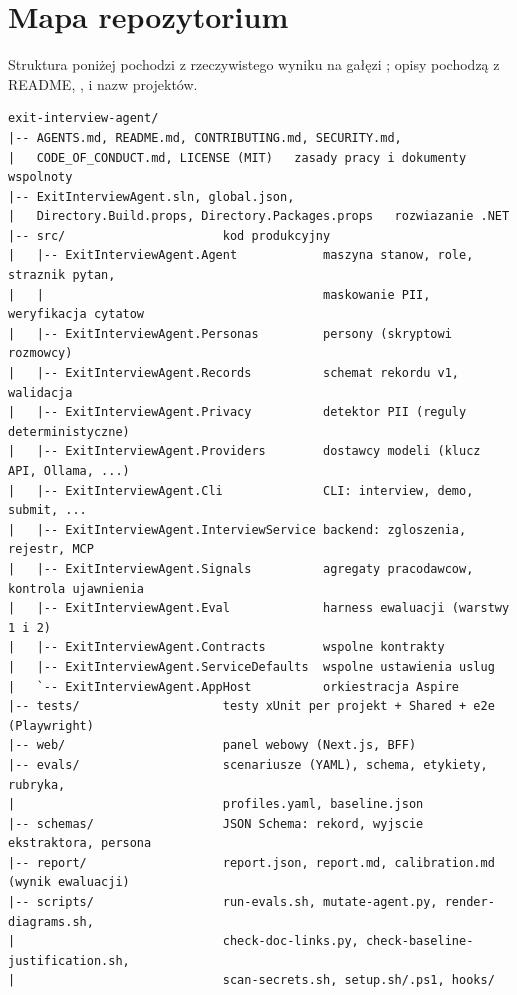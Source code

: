 \section{Mapa repozytorium}
\label{sec:p4-mapa}

Struktura poniżej pochodzi z rzeczywistego wyniku  na gałęzi ; opisy pochodzą z README, ,  i nazw projektów.

\begin{Verbatim}[fontsize=\footnotesize]
exit-interview-agent/
|-- AGENTS.md, README.md, CONTRIBUTING.md, SECURITY.md,
|   CODE_OF_CONDUCT.md, LICENSE (MIT)   zasady pracy i dokumenty wspolnoty
|-- ExitInterviewAgent.sln, global.json,
|   Directory.Build.props, Directory.Packages.props   rozwiazanie .NET
|-- src/                      kod produkcyjny
|   |-- ExitInterviewAgent.Agent            maszyna stanow, role, straznik pytan,
|   |                                       maskowanie PII, weryfikacja cytatow
|   |-- ExitInterviewAgent.Personas         persony (skryptowi rozmowcy)
|   |-- ExitInterviewAgent.Records          schemat rekordu v1, walidacja
|   |-- ExitInterviewAgent.Privacy          detektor PII (reguly deterministyczne)
|   |-- ExitInterviewAgent.Providers        dostawcy modeli (klucz API, Ollama, ...)
|   |-- ExitInterviewAgent.Cli              CLI: interview, demo, submit, ...
|   |-- ExitInterviewAgent.InterviewService backend: zgloszenia, rejestr, MCP
|   |-- ExitInterviewAgent.Signals          agregaty pracodawcow, kontrola ujawnienia
|   |-- ExitInterviewAgent.Eval             harness ewaluacji (warstwy 1 i 2)
|   |-- ExitInterviewAgent.Contracts        wspolne kontrakty
|   |-- ExitInterviewAgent.ServiceDefaults  wspolne ustawienia uslug
|   `-- ExitInterviewAgent.AppHost          orkiestracja Aspire
|-- tests/                    testy xUnit per projekt + Shared + e2e (Playwright)
|-- web/                      panel webowy (Next.js, BFF)
|-- evals/                    scenariusze (YAML), schema, etykiety, rubryka,
|                             profiles.yaml, baseline.json
|-- schemas/                  JSON Schema: rekord, wyjscie ekstraktora, persona
|-- report/                   report.json, report.md, calibration.md (wynik ewaluacji)
|-- scripts/                  run-evals.sh, mutate-agent.py, render-diagrams.sh,
|                             check-doc-links.py, check-baseline-justification.sh,
|                             scan-secrets.sh, setup.sh/.ps1, hooks/

\end{Verbatim}
